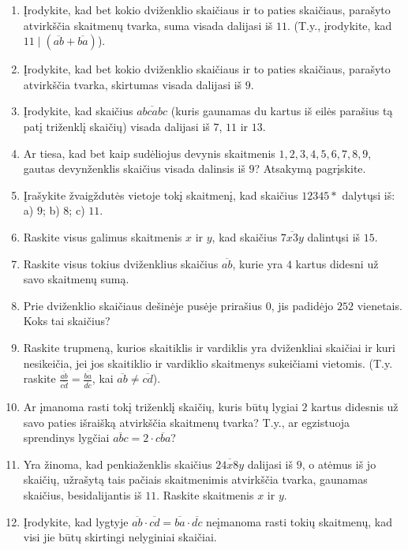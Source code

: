 \documentclass[11pt,a4paper]{scrartcl}
\begin{document}
\begin{enumerate}
    \renewcommand{\labelenumi}{\textbf{\theenumi.}}
    \item Įrodykite, kad bet kokio dviženklio skaičiaus ir to paties skaičiaus, parašyto atvirkščia skaitmenų tvarka, suma visada dalijasi iš $11$. (T.y., įrodykite, kad $11 \mid (\overline{ab} + \overline{ba})$).
    \item Įrodykite, kad bet kokio dviženklio skaičiaus ir to paties skaičiaus, parašyto atvirkščia tvarka, skirtumas visada dalijasi iš $9$.
    \item Įrodykite, kad skaičius $\overline{abcabc}$ (kuris gaunamas du kartus iš eilės parašius tą patį triženklį skaičių) visada dalijasi iš $7$, $11$ ir $13$.
    \item Ar tiesa, kad bet kaip sudėliojus devynis skaitmenis $1, 2, 3, 4, 5, 6, 7, 8, 9$, gautas devynženklis skaičius visada dalinsis iš $9$? Atsakymą pagrįskite.
    \item Įrašykite žvaigždutės vietoje tokį skaitmenį, kad skaičius $12345*$ dalytųsi iš: 
    a) $9$; \quad b) $8$; \quad c) $11$.
    \item Raskite visus galimus skaitmenis $x$ ir $y$, kad skaičius $\overline{7x3y}$ dalintųsi iš $15$.
    \item Raskite visus tokius dviženklius skaičius $\overline{ab}$, kurie yra $4$ kartus didesni už savo skaitmenų sumą.
    \item Prie dviženklio skaičiaus dešinėje pusėje prirašius $0$, jis padidėjo $252$ vienetais. Koks tai skaičius?
    \item Raskite trupmeną, kurios skaitiklis ir vardiklis yra dviženkliai skaičiai ir kuri nesikeičia, jei jos skaitiklio ir vardiklio skaitmenys sukeičiami vietomis. (T.y. raskite $\frac{\overline{ab}}{\overline{cd}} = \frac{\overline{ba}}{\overline{dc}}$, kai $\overline{ab} \neq \overline{cd}$).
    \item Ar įmanoma rasti tokį triženklį skaičių, kuris būtų lygiai $2$ kartus didesnis už savo paties išraišką atvirkščia skaitmenų tvarka? T.y., ar egzistuoja sprendinys lygčiai $\overline{abc} = 2 \cdot \overline{cba}$?
    \item Yra žinoma, kad penkiaženklis skaičius $\overline{24x8y}$ dalijasi iš $9$, o atėmus iš jo skaičių, užrašytą tais pačiais skaitmenimis atvirkščia tvarka, gaunamas skaičius, besidalijantis iš $11$. Raskite skaitmenis $x$ ir $y$.
    \item Įrodykite, kad lygtyje $\overline{ab} \cdot \overline{cd} = \overline{ba} \cdot \overline{dc}$ neįmanoma rasti tokių skaitmenų, kad visi jie būtų skirtingi nelyginiai skaičiai.

\end{enumerate}
\end{document}
